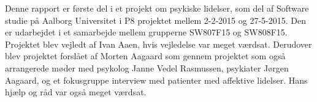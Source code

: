 Denne rapport er første del i et projekt om psykiske lidelser, som del af Software studie på Aalborg Universitet i P8 projektet mellem 2-2-2015 og 27-5-2015. 
Den er udarbejdet i et samarbejde mellem grupperne SW807F15 og SW808F15.
Projektet blev vejledt af Ivan Aaen, hvis vejledelse var meget værdsat.
Derudover blev projektet forslået af Morten Aagaard som gennem projektet som også arrangerede møder med psykolog Janne Vedel Rasmussen, psykiater Jørgen Aagaard, og et fokusgruppe interview med patienter med affektive lidelser. Hans hjælp og råd var også meget værdsat.